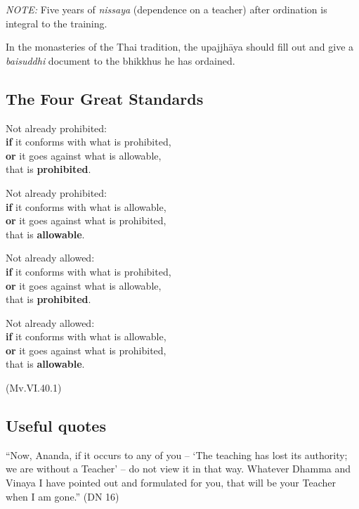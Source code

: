 
\emph{NOTE:} Five years of \emph{nissaya} (dependence on a teacher)
after ordination is integral to the training.

In the monasteries of the Thai tradition, the upajjhāya should fill out
and give a \emph{baisuddhi} document to the bhikkhus he has ordained.

\subsection{The Four Great Standards}

\enlargethispage*{\baselineskip}
\begin{multicols}{2}

Not already prohibited:\\
\textbf{if} it conforms with what is prohibited,\\
\textbf{or} it goes against what is allowable,\\
that is \textbf{prohibited}.

Not already prohibited:\\
\textbf{if} it conforms with what is allowable,\\
\textbf{or} it goes against what is prohibited,\\
that is \textbf{allowable}.

\columnbreak

Not already allowed:\\
\textbf{if} it conforms with what is prohibited,\\
\textbf{or} it goes against what is allowable,\\
that is \textbf{prohibited}.

Not already allowed:\\
\textbf{if} it conforms with what is allowable,\\
\textbf{or} it goes against what is prohibited,\\
that is \textbf{allowable}.

\end{multicols}

(Mv.VI.40.1)

\clearpage

\subsection{Useful quotes}

``Now, Ananda, if it occurs to any of you -- `The teaching has lost its
authority; we are without a Teacher' -- do not view it in that way.
Whatever Dhamma and Vinaya I have pointed out and formulated for you,
that will be your Teacher when I am gone.'' (DN 16)

